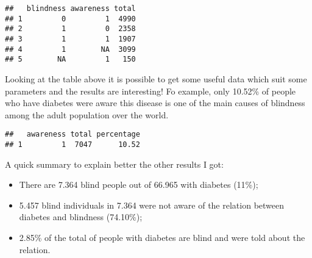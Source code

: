 \documentclass[
]{article}
\newenvironment{Shaded}{\begin{snugshade}}{\end{snugshade}}
\newcommand{\AttributeTok}[1]{\textcolor[rgb]{0.77,0.63,0.00}{#1}}
\newcommand{\DecValTok}[1]{\textcolor[rgb]{0.00,0.00,0.81}{#1}}
\newcommand{\FunctionTok}[1]{\textcolor[rgb]{0.00,0.00,0.00}{#1}}
\newcommand{\NormalTok}[1]{#1}
\newcommand{\OtherTok}[1]{\textcolor[rgb]{0.56,0.35,0.01}{#1}}
\newcommand{\SpecialCharTok}[1]{\textcolor[rgb]{0.00,0.00,0.00}{#1}}
\newcommand{\StringTok}[1]{\textcolor[rgb]{0.31,0.60,0.02}{#1}}
\providecommand{\tightlist}{%
  \setlength{\itemsep}{0pt}\setlength{\parskip}{0pt}}
\begin{document}
\begin{verbatim}
##   blindness awareness total
## 1         0         1  4990
## 2         1         0  2358
## 3         1         1  1907
## 4         1        NA  3099
## 5        NA         1   150
\end{verbatim}

Looking at the table above it is possible to get some useful data which
suit some parameters and the results are interesting! Fo example, only
10.52\% of people who have diabetes were aware this disease is one of
the main causes of blindness among the adult population over the world.

\begin{Shaded}
\end{Shaded}

\begin{verbatim}
##   awareness total percentage
## 1         1  7047      10.52
\end{verbatim}

A quick summary to explain better the other results I got:

\begin{itemize}
\tightlist
\item
  There are 7.364 blind people out of 66.965 with diabetes (11\%);
\item
  5.457 blind individuals in 7.364 were not aware of the relation
  between diabetes and blindness (74.10\%);
\item
  2.85\% of the total of people with diabetes are blind and were told
  about the relation.
\end{itemize}
\end{document}
